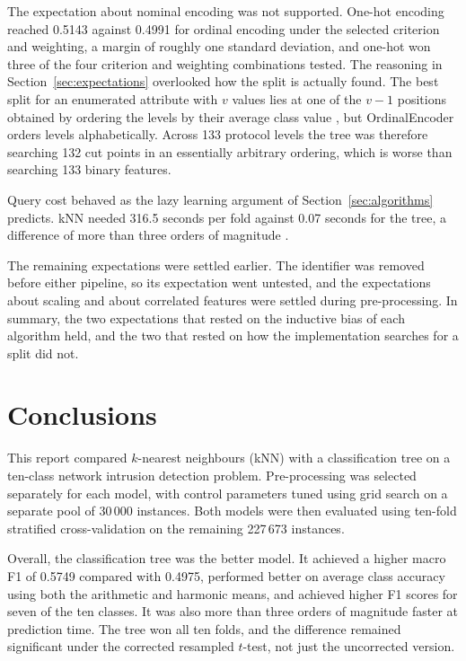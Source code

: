\documentclass[conference]{IEEEtran}
\begin{document}
The expectation about nominal encoding was not supported. One-hot encoding
reached 0.5143 against 0.4991 for ordinal encoding under the selected criterion
and weighting, a margin of roughly one standard deviation, and one-hot won three
of the four criterion and weighting combinations tested. The reasoning in
Section~\ref{sec:expectations} overlooked how the split is actually found. The
best split for an enumerated attribute with $v$ values lies at one of the $v-1$
positions obtained by ordering the levels by their average class value
\cite{wang1997}, but OrdinalEncoder orders levels alphabetically. Across 133
protocol levels the tree was therefore searching 132 cut points in an
essentially arbitrary ordering, which is worse than searching 133 binary
features.

Query cost behaved as the lazy learning argument of
Section~\ref{sec:algorithms} predicts. kNN needed 316.5 seconds per fold
against 0.07 seconds for the tree, a difference of more than three orders of
magnitude \cite{kelleher2015}.

The remaining expectations were settled earlier. The identifier was removed
before either pipeline, so its expectation went untested, and the expectations
about scaling and about correlated features were settled during pre-processing.
In summary, the two expectations that rested on the inductive bias of each
algorithm held, and the two that rested on how the implementation searches for
a split did not.

\section{Conclusions}
\label{sec:conclusion}

This report compared $k$-nearest neighbours (kNN) with a classification tree on a 
ten-class network intrusion detection problem. Pre-processing was selected 
separately for each model, with control parameters tuned using grid search on a 
separate pool of 30\,000 instances. Both models were then evaluated using 
ten-fold stratified cross-validation on the remaining 227\,673 instances.

Overall, the classification tree was the better model. It achieved a higher 
macro F1 of 0.5749 compared with 0.4975, performed better on average class accuracy 
using both the arithmetic and harmonic means, and achieved higher F1 scores for 
seven of the ten classes. It was also more than three orders of magnitude 
faster at prediction time. The tree won all ten folds, and the difference 
remained significant under the corrected resampled $t$-test, not just the 
uncorrected version.
\end{document}
